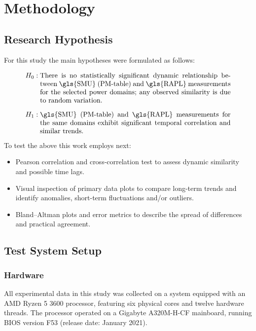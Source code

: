 \section{Methodology}

\subsection{Research Hypothesis}

For this study the main hypotheses were formulated as follows:

\begin{align*}
H_{0}&: 
\begin{minipage}[t]{0.8\linewidth}
There is no statistically significant dynamic relationship between
\gls{SMU} (PM-table) and \gls{RAPL} measurements for the
selected power domains; any observed similarity
is due to random variation.
\end{minipage}\\[0.8em]
H_{1}&:
\begin{minipage}[t]{0.8\linewidth}
\gls{SMU} (PM-table) and \gls{RAPL} measurements for the same domains
exhibit significant temporal correlation and similar trends.
\end{minipage}
\end{align*}

To test the above this work employs next:
\begin{itemize}
  \item Pearson correlation and cross-correlation test to assess dynamic
        similarity and possible time lags.
  \item Visual inspection of primary data plots to compare long-term trends
        and identify anomalies, short-term fluctuations and/or outliers.
  \item Bland–Altman plots and error metrics to describe the spread of
        differences and practical agreement.
\end{itemize}

\subsection{Test System Setup}

\subsubsection{Hardware}

All experimental data in this study was collected on a system equipped with an
AMD Ryzen 5 3600 processor, featuring six physical cores and twelve hardware
threads. The processor operated on a Gigabyte A320M-H-CF mainboard, running
\gls{BIOS} version F53 (release date: January 2021).  

